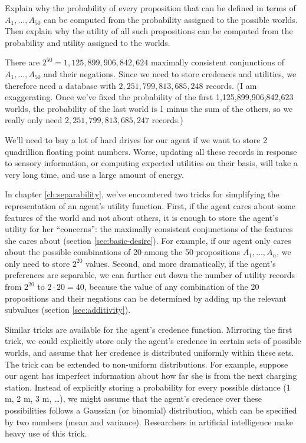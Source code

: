 \begin{exercise}{3}
  Explain why the probability of every proposition that can be defined
  in terms of $A_1,\ldots,A_{50}$ can be computed from the probability
  assigned to the possible worlds. Then explain why the utility of all
  such propositions can be computed from the probability and utility
  assigned to the worlds. 
\end{exercise}


There are $2^{50} = 1,125,899,906,842,624$ maximally consistent
conjunctions of $A_1,\ldots,A_{50}$ and their negations. Since we need
to store credences and utilities, we therefore need a database with
$2,251,799,813,685,248$ records. (I am exaggerating. Once
we've fixed the probability of the first 1,125,899,906,842,623 worlds,
the probability of the last world is 1 minus the sum of the others, so
we really only need $2,251,799,813,685,247$ records.)

We'll need to buy a lot of hard drives for our agent if we want to
store 2 quadrillion floating point numbers. Worse, updating all these
records in response to sensory information, or computing expected
utilities on their basis, will take a very long time, and use a large
amount of energy.

In chapter \ref{ch:separability}, we've encountered two tricks for
simplifying the representation of an agent's utility function. First,
if the agent cares about some features of the world and not about
others, it is enough to store the agent's utility for her
``concerns'': the maximally consistent conjunctions of the features
she cares about (section \ref{sec:basic-desire}). For example,
if our agent only cares about the possible combinations of 20 among
the 50 propositions $A_1,\ldots,A_n$, we only need to store $2^{20}$
values. Second, and more dramatically, if the agent's preferences are
separable, we can further cut down the number of utility records from
$2^{20}$ to $2 \cdot 20 = 40$, because the value of any combination of
the 20 propositions and their negations can be determined by adding up
the relevant subvalues (section \ref{sec:additivity}).

Similar tricks are available for the agent's credence
function. Mirroring the first trick, we could explicitly store only
the agent's credence in certain sets of possible worlds, and assume
that her credence is distributed uniformly within these sets. The
trick can be extended to non-uniform distributions. For example,
suppose our agent has imperfect information about how far she is from
the next charging station. Instead of explicitly storing a probability
for every possible distance (1 m, 2 m, 3 m, \ldots), we might assume
that the agent's credence over these possibilities follows a Gaussian
(or binomial) distribution, which can be specified by two numbers
(mean and variance). Researchers in artificial intelligence make heavy
use of this trick.

